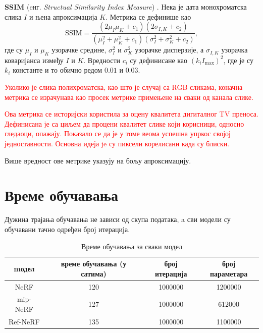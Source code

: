 \documentclass[12pt, a4paper, twoside]{book}
\numberwithin{equation}{chapter}
\numberwithin{theorem}{section}
\numberwithin{definition}{section}
\numberwithin{definitionChapter}{chapter}
\begin{document}
\noindent \textbf{SSIM} (eнг. \textit{Structual Similarity Index Measure}) \cite{ssim}.  Нека је дата монохроматска
слика $I$ и њена апроксимација $K$. Метрика се дефинише као
\begin{equation}
	\text{SSIM} = \frac{(2\mu_{I}\mu_{K} + c_1)(2\sigma_{I, K} + c_2)}{(\mu_{I}^2 + \mu_{K}^2 + c_1)(\sigma_{I}^2 + \sigma_{K}^2 + c_2)},
\end{equation}
где су $\mu_{I}$ и $\mu_{K}$ узорачке средине, $\sigma_{I}^2$ и $\sigma_{K}^2$ узорачке дисперзије, а $\sigma_{I, K}$
узорачка коваријанса између $I$ и $K$. Вредности $c_i$ су дефинисане као $(k_i I_{\max})^2$, где је су $k_i$ константе
и то обично редом $0.01$ и $0.03$.

\textcolor{red}{Уколико је слика полихроматска, као што је случај са RGB сликама, коначна метрика се израчунава као просек метрике
примењене на сваки од канала слике.}

\textcolor{red}{Ова метрика се историјски користила за оцену квалитета дигиталног TV преноса. Дефинисана је са циљем да процени квалитет
слике који корисници, односно гледаоци, опажају. Показало се да је у томе веома успешна упркос својој једноставности. Основна идеја je су пиксели
корелисани када су блиски.}


Више вредност ове метрике указују на бољу апроксимацију.

\section{Време обучавања}

Дужина трајања обучавања не зависи од скупа података, a сви модели су обучавани тачно одређен број итерација.

\begin{table}[H]
	\centering
	\begin{tabular}{cccc} \toprule
		{mодел} 	& {време обучавања (у сатима)} 	& {број итерација} & {број параметара} \\ \midrule
		{NeRF} 		& 120 							& 1000000 & 1200000\\ 
		{mip-NeRF} 	& 127 							& 1000000 & 612000\\
		{Ref-NeRF} 	& 135 							& 1000000 & 1100000\\ \bottomrule
	\end{tabular}
	\caption{Време обучавања за сваки модел}
	\label{table-duration}
\end{table}
\end{document}
